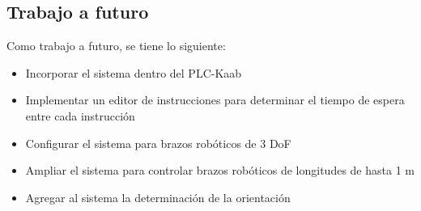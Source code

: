 \subsection{Trabajo a futuro}

Como trabajo a futuro, se tiene lo siguiente:

\begin{itemize}
	\item Incorporar el sistema dentro del PLC-Kaab
	\item Implementar un editor de instrucciones para determinar el tiempo de espera entre cada instrucción
	\item Configurar el sistema para brazos robóticos de 3 DoF
	\item Ampliar el sistema para controlar brazos robóticos de longitudes de hasta 1 m
	\item Agregar al sistema la determinación de la orientación
\end{itemize}